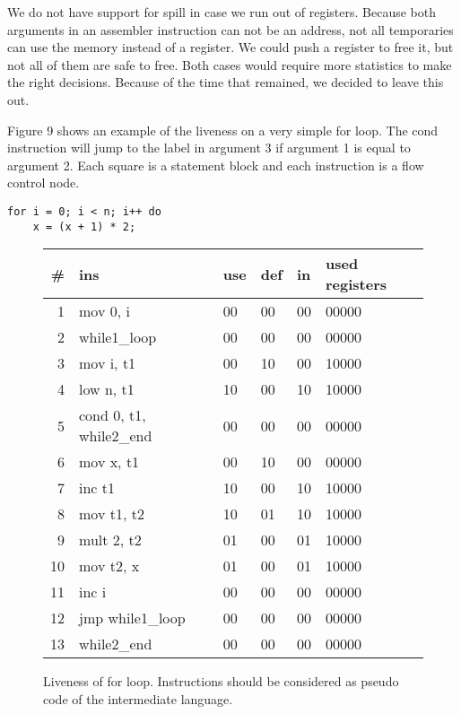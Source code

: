 \documentclass{article}
\begin{document}
We do not have support for spill in case we run out of registers. Because both arguments in an assembler instruction can not be an address, not all temporaries can use the memory instead of a register. We could push a register to free it, but not all of them are safe to free. Both cases would require more statistics to make the right decisions. Because of the time that remained, we decided to leave this out.

Figure 9 shows an example of the liveness on a very simple for loop. The cond instruction will jump to the label in argument 3 if argument 1 is equal to argument 2. Each square is a statement block and each instruction is a flow control node. 

\begin{lstlisting}
for i = 0; i < n; i++ do
    x = (x + 1) * 2;
\end{lstlisting}

\begin{figure}[h]
    \begin{tabular}{|r|l|l|l|l|l|}
         \hline
         \# & ins                    & use & def & in & used registers  \\
         \hline
         \hline
         1 & mov  0, i               & 00 & 00 & 00 & 00000 \\
         \hline
         \hline
         2 & while1\_loop            & 00 & 00 & 00 & 00000 \\
         3 & mov  i, t1              & 00 & 10 & 00 & 10000 \\
         4 & low  n, t1              & 10 & 00 & 10 & 10000 \\
         5 & cond 0, t1, while2\_end & 00 & 00 & 00 & 00000 \\
         \hline
         \hline
         6 & mov  x, t1              & 00 & 10 & 00 & 00000 \\
         7 & inc t1                  & 10 & 00 & 10 & 10000 \\
         8 & mov t1, t2              & 10 & 01 & 10 & 10000 \\
         9 & mult 2, t2              & 01 & 00 & 01 & 10000 \\
        10 & mov t2, x               & 01 & 00 & 01 & 10000 \\
         \hline
         \hline
        11 & inc  i                  & 00 & 00 & 00 & 00000 \\
        12 & jmp while1\_loop        & 00 & 00 & 00 & 00000 \\
        13 & while2\_end             & 00 & 00 & 00 & 00000 \\
        \hline
    \end{tabular}
    \caption{Liveness of for loop. Instructions should be considered as pseudo code of the intermediate language. }
    \label{fig:my_label}
\end{figure}
\end{document}
